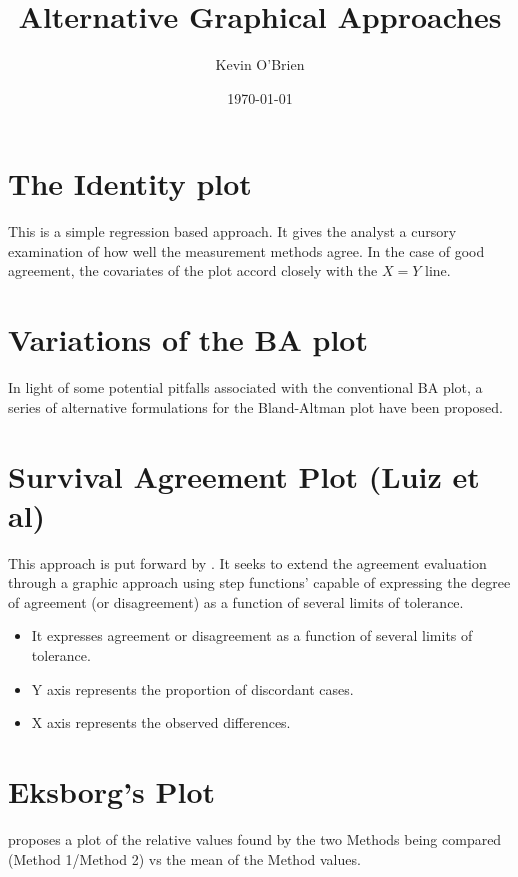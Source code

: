 \documentclass[12pt, a4paper]{article}
\begin{document}
\author{Kevin O'Brien}
\title{Alternative Graphical Approaches}
\date{\today}
\maketitle
\tableofcontents \setcounter{tocdepth}{2}

\newpage

\section{The Identity plot} This is a simple regression based approach. It gives the analyst a cursory examination of how well the measurement methods agree. In the case of good agreement, the covariates of the plot accord closely with the $X=Y$ line.

\section{Variations of the BA plot}

In light of some potential pitfalls associated with the conventional BA plot, a series of alternative formulations for the Bland-Altman plot have been proposed.



\section{Survival Agreement Plot (Luiz et al)}
This approach is put forward by \citet{Luiz}. It seeks to extend the agreement evaluation through a graphic approach using step functions' capable of expressing the degree of agreement (or disagreement) as a function of several limits of tolerance.

\begin{itemize}
\item It expresses agreement or disagreement as a function of several
limits of tolerance.
\item Y axis represents the proportion of discordant cases.
\item X axis represents the observed differences.
\end{itemize}

\section{Eksborg's Plot}
\citet{Eksborg} proposes a plot of the relative values found by the two
Methods being compared (Method 1/Method 2) vs the mean of the Method
values.
\end{document}
